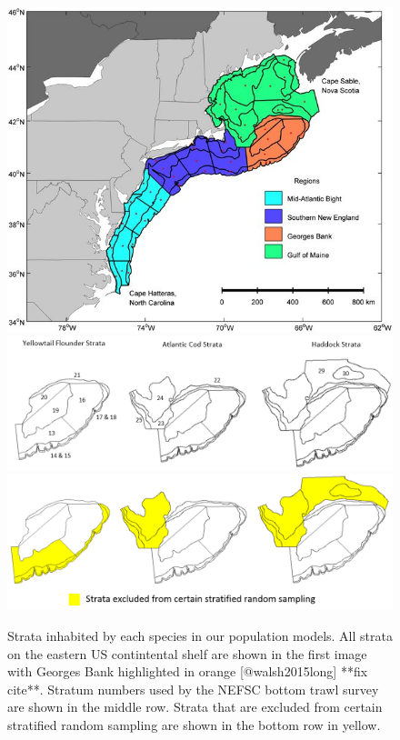 \documentclass[
  12pt,
]{article}
\begin{document}
\begin{figure}

{\centering \includegraphics[width=0.95\linewidth]{Images/GB_strata} \includegraphics[width=0.95\linewidth]{Images/Strata2} \includegraphics[width=0.95\linewidth]{Images/Excluded_strata2} 

}

\caption{Strata inhabited by each species in our population models. All strata on the eastern US contintental shelf are shown in the first image with Georges Bank highlighted in orange [@walsh2015long] **fix cite**. Stratum numbers used by the NEFSC bottom trawl survey are shown in the middle row. Strata that are excluded from certain stratified random sampling are shown in the bottom row in yellow.}\label{fig:strata-plot}
\end{figure}
\end{document}
